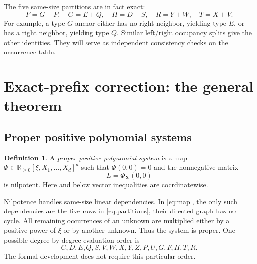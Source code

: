 \documentclass[11pt,a4paper]{article}
\theoremstyle{definition}
\newtheorem{definition}[theorem]{Definition}
\theoremstyle{remark}
\newcommand{\R}{\mathbb R}
\newcommand{\bX}{\boldsymbol X}
\begin{document}
The five same-size partitions are in fact exact:
\begin{equation}\label{eq:partitions}
 F=G+P,\quad G=E+Q,\quad H=D+S,\quad R=Y+W,\quad T=X+V.
\end{equation}
For example, a type-$G$ anchor either has no right neighbor, yielding type
$E$, or has a right neighbor, yielding type $Q$. Similar left/right occupancy
splits give the other identities. They will serve as independent consistency
checks on the occurrence table.

\section{Exact-prefix correction: the general theorem}
\label{sec:prefix}

\subsection{Proper positive polynomial systems}
\begin{definition}
A \emph{proper positive polynomial system} is a map
$\Phi\in\R_{\geq0}[\xi,X_1,\ldots,X_d]^d$ such that
$\Phi(0,0)=0$ and the nonnegative matrix
\[
 L=\Phi_{\bX}(0,0)
\]
is nilpotent. Here and below vector inequalities are coordinatewise.
\end{definition}

Nilpotence handles same-size linear dependencies. In \eqref{eq:map}, the
only such dependencies are the five rows in \eqref{eq:partitions}; their
directed graph has no cycle. All remaining occurrences of an unknown are
multiplied either by a positive power of $\xi$ or by another unknown.
Thus the system is proper. One possible degree-by-degree evaluation order is
\[
 C,D,E,Q,S,V,W,X,Y,Z,P,U,G,F,H,T,R.
\]
The formal development does not require this particular order.
\end{document}
